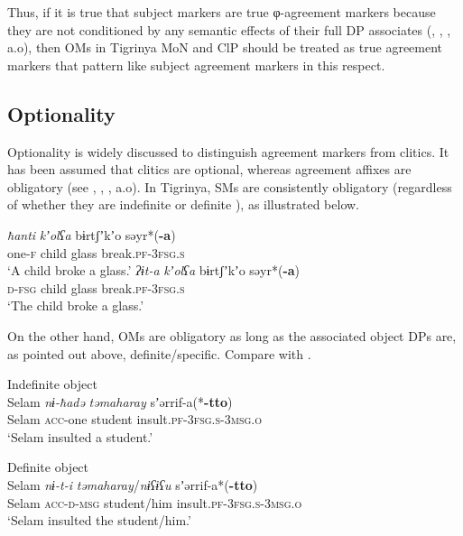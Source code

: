\documentclass[output=paper]{langscibook}
\begin{document}
Thus, if it is true that subject markers are true φ-agreement markers because they are not conditioned by any semantic effects of their full DP associates (\citealt{preminger09}, \citealt{nevins11a}, \citealt{kramer14}, a.o), then OMs in Tigrinya MoN and ClP should be treated as true agreement markers that pattern like subject agreement markers in this respect.

\subsection{Optionality}
Optionality is widely discussed to distinguish agreement markers from clitics. It has been assumed that clitics are optional, whereas agreement affixes are obligatory (see \citealt{corbett2006}, \citealt{nevins11a}, \citealt{baker12}, a.o).
In Tigrinya, SMs are consistently obligatory (regardless of whether they are indefinite  or definite ), as illustrated below. 
\begin{multicols}{2}
\ea
\ea\label{ex:Gebregziabher:indef1} 
\gll \textit{ħanti} \textit{kʼolʕa} bɨrtʃʼkʼo səyr*({\textbf{-a}}) \\
one-{\scshape f} child glass break.{\scshape pf-3fsg.s}\\
\glt `A child broke a glass.'
\ex\label{ex:Gebregziabher:defsubj} 
\gll \textit{ʔɨt-a} \textit{kʼolʕa} bɨrtʃʼkʼo səyr*({\textbf{-a}}) \\
{\scshape d-fsg} child glass break.{\scshape pf-3fsg.s}\\
\glt `The child broke a glass.'
\z
\z
\end{multicols}
\noindent On the other hand, OMs are obligatory as long as the associated object DPs are, as pointed out above, definite/specific. Compare  with . 


\ea\label{ex:Gebregziabher:indef2} 
\ea\label{ex:Gebregziabher:indefobj} Indefinite object \\
\gll Selam \textit{nɨ-ħadə} \textit{təmaharay} sʼərrif-a(*{\textbf{-tto}}) \\
Selam {\scshape acc-}one student insult.{\scshape pf-3fsg.s-3msg.o}\\
\glt `Selam insulted a student.'

\ex\label{ex:Gebregziabher:defobj} Definite object \\
\gll Selam \textit{nɨ-t-i} \textit{təmaharay}/\textit{nɨʕɨʕu} sʼərrif-a*({\textbf{-tto}}) \\
Selam {\scshape acc-d-msg} student/him insult.{\scshape pf-3fsg.s-3msg.o}\\
\glt `Selam insulted the student/him.'
\z
\z
\end{document}
